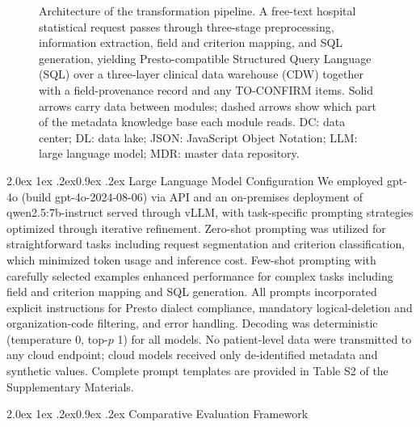 \documentclass[10pt]{article}
\makeatletter
\renewcommand\subsection{\@startsection{subsection}{2}{\z@}%
  {2.0ex \@plus 1ex \@minus .2ex}{0.9ex \@plus .2ex}%
  {\normalfont\normalsize\bfseries}}
\makeatother
\begin{document}
\begin{figure}[!ht]
\caption{Architecture of the transformation pipeline. A free-text hospital
statistical request passes through three-stage preprocessing, information
extraction, field and criterion mapping, and SQL generation, yielding
Presto-compatible Structured Query Language (SQL) over a three-layer clinical
data warehouse (CDW) together with a field-provenance record and any
TO-CONFIRM items. Solid arrows carry data between modules; dashed arrows
show which part of the metadata knowledge base each module reads. DC: data
center; DL: data lake; JSON: JavaScript Object Notation; LLM: large language
model; MDR: master data repository.}
\label{fig:arch}
\end{figure}

\subsection{Large Language Model Configuration}
We employed gpt-4o (build gpt-4o-2024-08-06) via API and an on-premises deployment of
qwen2.5:7b-instruct served through vLLM, with task-specific prompting strategies
optimized through iterative refinement. Zero-shot prompting was utilized for
straightforward tasks including request segmentation and criterion
classification, which minimized token usage and inference cost. Few-shot
prompting with carefully selected examples enhanced performance for complex
tasks including field and criterion mapping and SQL generation. All prompts
incorporated explicit instructions for Presto dialect compliance, mandatory
logical-deletion and organization-code filtering, and error handling. Decoding
was deterministic (temperature 0, top-$p$ 1) for all models. No patient-level
data were transmitted to any cloud endpoint; cloud models received only
de-identified metadata and synthetic values. Complete prompt templates are
provided in Table S2 of the Supplementary Materials.

\subsection{Comparative Evaluation Framework}
\end{document}

